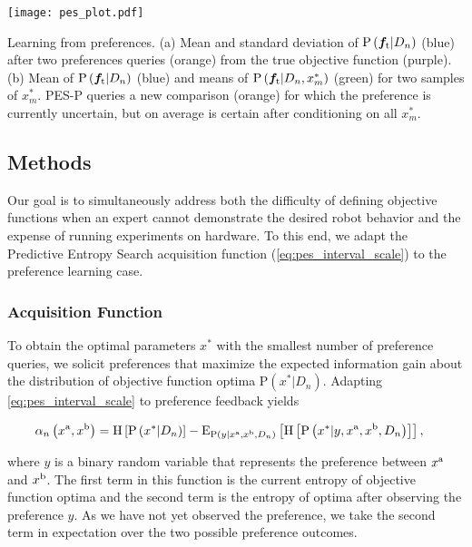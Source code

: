 \begin{marginfigure}
    \centering
    \texttt{[image: pes\_plot.pdf]}
    \caption{Learning from preferences. (a) Mean and standard deviation of
    $\prob{\vecf{f}[\tn{t}]|D_n}$ (blue) after two preferences queries (orange)
    from the true objective function (purple). (b) Mean of
    $\prob{\vecf{f}[\tn{t}]|D_n}$ (blue) and means of
    $\prob{\vecf{f}[\tn{t}]|D_n, x_m^*}$ (green) for two samples of $x_m^*$.
    PES-P queries a new comparison (orange) for which the preference is
    currently uncertain, but on average is certain after conditioning on all
    $x_m^*$.}\label{fig:pes_plot}
\end{marginfigure}

\subsection{Methods}
Our goal is to simultaneously address both the difficulty of defining objective
functions when an expert cannot demonstrate the desired robot behavior and the
expense of running experiments on hardware. To this end, we adapt the Predictive
Entropy Search acquisition function (\cref{eq:pes_interval_scale}) to the
preference learning case.

\subsubsection{Acquisition Function}
To obtain the optimal parameters $x^*$ with the smallest number of preference
queries, we solicit preferences that maximize the expected information gain
about the distribution of objective function optima $\mathrm{P}(x^*|D_n)$.
Adapting \cref{eq:pes_interval_scale} to preference feedback yields
\begin{fullwidth}
\begin{align}
    &\alpha_n \left(x^\tn{a}, x^\tn{b}\right) 
        = \funcsb{H}{\prob{x^*|D_n}} - \funcsb{E}[\prob{y|x^\tn{a},x^\tn{b},D_n}]
            {\funcsb{H}{\prob{x^*|y, x^\tn{a}, x^\tn{b}, D_n}}},
    \label{eq:acquisition_orig}
\end{align}
\end{fullwidth}
where $y$ is a binary random variable that represents the preference between
$x^{\mathrm{a}}$ and $x^{\mathrm{b}}$. The first term in this function is the current
entropy of objective function optima and the second term is the entropy of
optima after observing the preference $y$. As we have not yet observed the
preference, we take the second term in expectation over the two possible
preference outcomes.

